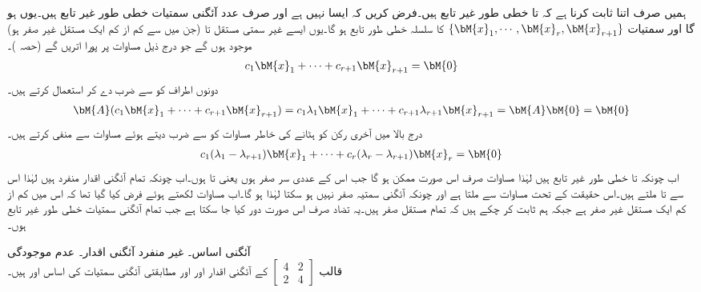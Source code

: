ہمیں صرف اتنا ثابت کرنا ہے کہ  تا  خطی طور غیر تابع ہیں۔فرض کریں کہ ایسا نہیں ہے اور صرف  عدد آئگنی سمتیات خطی طور غیر تابع ہیں۔یوں  ہو گا اور  سمتیات
$\{\bM{x}_1, \cdots , \bM{x}_r,\bM{x}_{r+1}  \}$
کا سلسلہ خطی طور تابع ہو گا۔یوں ایسے غیر سمتی مستقل  تا  (جن میں سے کم از کم ایک مستقل غیر صفر ہو) موجود ہوں گے جو درج ذیل مساوات پر پورا اتریں گے (حصہ )۔
\begin{align}\label{مساوات_آئگنی_اساس_ثبوت_الف}
c_1\bM{x}_1+\cdots+c_{r+1}\bM{x}_{r+1}=\bM{0}
\end{align}  
دونوں اطراف کو  سے ضرب دے کر  استعمال کرتے ہیں۔
\begin{align}\label{مساوات_آئگنی_اساس_ثبوت_ب}
\bM{A}(c_1\bM{x}_1+\cdots+c_{r+1}\bM{x}_{r+1})=c_1\lambda_1\bM{x}_1+\cdots+c_{r+1}\lambda_{r+1}\bM{x}_{r+1}=\bM{A}\bM{0}=\bM{0}
\end{align}  
درج بالا میں آخری رکن کو ہٹانے کی خاطر مساوات  کو  سے ضرب دیتے ہوئے مساوات  سے منفی کرتے ہیں۔
\begin{align}\label{مساوات_آئگنی_اساس_ثبوت_پ}
c_1(\lambda_1-\lambda_{r+1})\bM{x}_1+\cdots+c_r(\lambda_r-\lambda_{r+1})\bM{x}_r=\bM{0}
\end{align}
اب چونکہ  تا  خطی طور غیر تابع ہیں لہٰذا مساوات  صرف اس صورت ممکن ہو گا جب اس کے عددی سر صفر ہوں یعنی  تا   ہوں۔اب چونکہ تمام آئگنی اقدار منفرد ہیں لہٰذا اس سے  تا  ملتے ہیں۔اس حقیقت کے تحت مساوات  سے  ملتا ہے اور چونکہ آئگنی سمتیہ صفر نہیں ہو سکتا لہٰذا  ہو گا۔اب  مساوات  لکھتے ہوئے فرض کیا گیا تھا کہ اس میں کم از کم ایک مستقل غیر صفر ہے جبکہ ہم ثابت کر چکے ہیں کہ تمام مستقل صفر ہیں۔یہ تضاد صرف اس صورت دور کیا جا سکتا ہے جب تمام آئگنی سمتیات خطی طور غیر تابع ہوں۔ 

\quad آئگنی اساس۔ غیر منفرد آئگنی اقدار۔ عدم موجودگی\\
قالب 
$ [\begin{smallmatrix}4&2\\2&4 \end{smallmatrix}]  $
کے آئگنی اقدار  اور  اور  مطابقتی آئگنی سمتیات کی اساس  اور  ہیں۔

